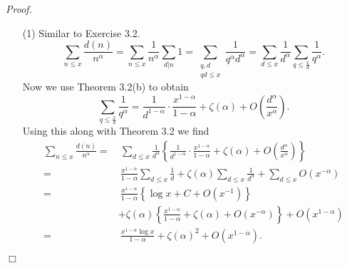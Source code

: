 \documentclass{article}
\begin{document}
\emph{Proof.}
\begin{enumerate}
\item[(1)]
  Similar to Exercise 3.2.
  \[
    \sum_{n \leq x} \frac{d(n)}{n^{\alpha}}
    = \sum_{n \leq x} \frac{1}{n^{\alpha}} \sum_{d|n} 1
    = \sum_{\substack{q,d \\ qd \leq x}} \frac{1}{q^{\alpha}d^{\alpha}}
    = \sum_{d \leq x} \frac{1}{d^{\alpha}} \sum_{q \leq \frac{x}{d}} \frac{1}{q^{\alpha}}.
  \]
  Now we use Theorem 3.2(b) to obtain
  \[
    \sum_{q \leq \frac{x}{d}} \frac{1}{q^{\alpha}}
    = \frac{1}{d^{1-\alpha}} \cdot \frac{x^{1-\alpha}}{1-\alpha} + \zeta(\alpha)
        + O\left(\frac{d^{\alpha}}{x^{\alpha}}\right).
  \]
  Using this along with Theorem 3.2 we find
  \begin{align*}
    \sum_{n \leq x} \frac{d(n)}{n^{\alpha}}
    =& \: \sum_{d \leq x}
        \frac{1}{d^{\alpha}} \left\{ \frac{1}{d^{1-\alpha}} \cdot \frac{x^{1-\alpha}}{1-\alpha}
            + \zeta(\alpha)
            + O\left(\frac{d^{\alpha}}{x^{\alpha}}\right) \right\} \\
    =& \: \frac{x^{1-\alpha}}{1-\alpha} \sum_{d \leq x} \frac{1}{d}
        + \zeta(\alpha) \sum_{d \leq x} \frac{1}{d^{\alpha}}
        + \sum_{d \leq x} O(x^{-\alpha}) \\
    =& \: \frac{x^{1-\alpha}}{1-\alpha} \left\{ \log x + C + O(x^{-1}) \right\} \\
      & + \zeta(\alpha)
          \left\{ \frac{x^{1-\alpha}}{1-\alpha} + \zeta(\alpha) + O(x^{-\alpha}) \right\}
          + O(x^{1-\alpha}) \\
    =& \: \frac{x^{1-\alpha} \log x}{1 - \alpha} + \zeta(\alpha)^2 + O(x^{1-\alpha}).
  \end{align*}
\end{enumerate}
$\Box$ \\\\






\end{document}

